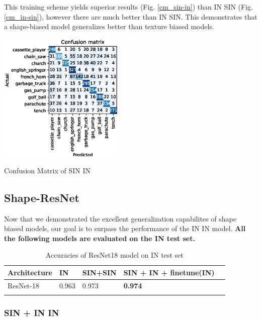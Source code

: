 \documentclass{article}
\begin{document}
This training scheme yields superior results (Fig. \ref{cm_sin-in}) than IN \texorpdfstring{\textrightarrow} .SIN (Fig. \ref{cm_in-sin}), however
there are much better than IN \texorpdfstring{\textrightarrow} .SIN.
This demonstrates that a shape-biased model generalizes better than texture biased models.

\begin{center}
  \captionsetup{type=figure}
  \includegraphics[width = 0.45\textwidth]{imgs/sin/sin-in/sin-in_confusion_matrix_0.624.eps}
  \caption{Confusion Matrix of SIN \texorpdfstring{\textrightarrow} .IN}
  \label{cm_sin-in}
\end{center}

\subsection{Shape-ResNet}

Now that we demonstrated the excellent generalization capabilites of shape biased models,
our goal is to surpass the performance of the IN \texorpdfstring{\textrightarrow} .IN model.
\textbf{All the following models are evaluated on the IN test set.}

\begin{table}[h!]
  \begin{tabular}{lllll}
  \Xhline{2\arrayrulewidth}
  Architecture & IN & SIN+SIN  & SIN + IN + finetune(IN) \\ \hline
  ResNet-18    & 0.963    & 0.973   & \textbf{0.974}    \\ \Xhline{2\arrayrulewidth}
  \end{tabular}
  \caption{Accuracies of ResNet18 model on IN test set}
\end{table}


\subsubsection{SIN + IN \texorpdfstring{\textrightarrow} .IN}
\end{document}
